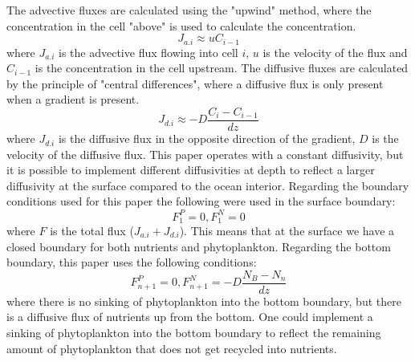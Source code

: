 The advective fluxes are calculated using the "upwind" method, where the concentration in the cell "above" is used to calculate the concentration.
\begin{equation} \label{eq:Jaeq}
    J_{a.i} \approx uC_{i-1}
\end{equation}
where $J_{a.i}$ is the advective flux flowing into cell $i$, $u$ is the velocity of the flux and $C_{i-1}$ is the concentration in the cell upstream.
The diffusive fluxes are calculated by the principle of "central differences", where a diffusive flux is only present when a gradient is present.
\begin{equation} \label{eq:Jdeq}
    J_{d.i} \approx -D\frac{C_i-C_{i-1}}{dz}
\end{equation}
where $J_{d.i}$ is the diffusive flux in the opposite direction of the gradient, $D$ is the velocity of the diffusive flux. This paper operates with a constant diffusivity, but it is possible to implement different diffusivities at depth to reflect a larger diffusivity at the surface compared to the ocean interior. 
Regarding the boundary conditions used for this paper the following were used in the surface boundary:
\begin{equation} \label{eq:SurfBound}
    F^{P}_{1} = 0, F^{N}_{1} = 0
\end{equation}
where $F$ is the total flux ($J_{a.i}+J_{d.i}$). This means that at the surface we have a closed boundary for both nutrients and phytoplankton. Regarding the bottom boundary, this paper uses the following conditions:
\begin{equation} \label{eq:BottomBound}
    F^{P}_{n+1} = 0, F^N_{n+1} = -D\frac{N_B-N_n}{dz}
\end{equation}
where there is no sinking of phytoplankton into the bottom boundary, but there is a diffusive flux of nutrients up from the bottom. One could implement a sinking of phytoplankton into the bottom boundary to reflect the remaining amount of phytoplankton that does not get recycled into nutrients.